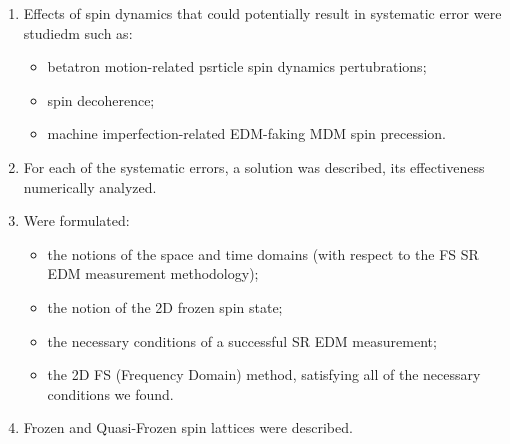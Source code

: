 \begin{enumerate}
  \item Effects of spin dynamics that could potentially result in systematic error were studiedm such as:
  \begin{itemize}
  	\item betatron motion-related psrticle spin dynamics pertubrations;
  	\item spin decoherence;
  	\item machine imperfection-related EDM-faking MDM spin precession.
  \end{itemize}
  \item For each of the systematic errors, a solution was described, its effectiveness numerically analyzed.
  \item Were formulated:
  \begin{itemize}
  	\item the notions of the space and time domains (with respect to the FS SR EDM measurement methodology);
  	\item the notion of the 2D frozen spin state;
  	\item the necessary conditions of a successful SR EDM measurement;
  	\item the 2D FS (Frequency Domain) method, satisfying all of the necessary conditions we found.
  \end{itemize}
  \item Frozen and Quasi-Frozen spin lattices were described.
\end{enumerate}
